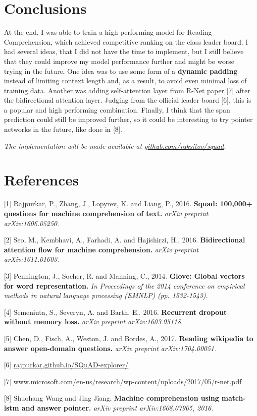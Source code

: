 \documentclass{article}
\begin{document}
\section{Conclusions}
At the end, I was able to train a high performing model for Reading Comprehension, which achieved competitive ranking on the class leader board. I had several ideas, that I did not have the time to implement, but I still believe that they could improve my model performance further and might be worse trying in the future. One idea was to use some form of a {\bf dynamic padding} instead of limiting context length and, as a result, to avoid even minimal loss of training data. Another was adding self-attention layer from R-Net paper [7] after the bidirectional attention layer. Judging from the official leader board [6], this is a popular and high performing combination. Finally, I think that the span prediction could still be improved further, so it could be interesting to try pointer networks in the future, like done in [8].

{\it The implementation will be made available at \url{github.com/raksitov/squad}.}

\section*{References}

[1] Rajpurkar, P., Zhang, J., Lopyrev, K. and Liang, P., 2016. {\bf Squad: 100,000+ questions for machine comprehension of text.} {\it arXiv preprint arXiv:1606.05250.}

[2] Seo, M., Kembhavi, A., Farhadi, A. and Hajishirzi, H., 2016. {\bf Bidirectional attention flow for machine comprehension.} {\it arXiv preprint arXiv:1611.01603.}

[3] Pennington, J., Socher, R. and Manning, C., 2014. {\bf Glove: Global vectors for word representation.} {\it In Proceedings of the 2014 conference on empirical methods in natural language processing (EMNLP) (pp. 1532-1543).}

[4] Semeniuta, S., Severyn, A. and Barth, E., 2016. {\bf Recurrent dropout without memory loss.} {\it arXiv preprint arXiv:1603.05118.}

[5] Chen, D., Fisch, A., Weston, J. and Bordes, A., 2017. {\bf Reading wikipedia to answer open-domain questions.} {\it arXiv preprint arXiv:1704.00051.}

[6] \url{rajpurkar.github.io/SQuAD-explorer/}

[7] \url{ www.microsoft.com/en-us/research/wp-content/uploads/2017/05/r-net.pdf }

[8] Shuohang Wang and Jing Jiang. {\bf Machine comprehension using match-lstm and answer pointer.}
{\it arXiv preprint arXiv:1608.07905, 2016.}
\end{document}
